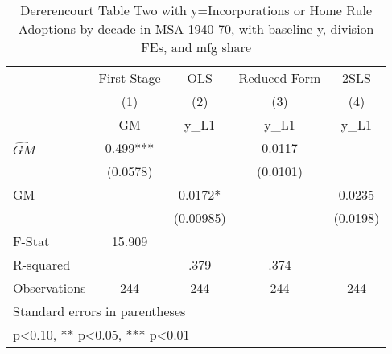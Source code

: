 \begin{table}[htbp]\centering
\def\sym#1{\ifmmode^{#1}\else\(^{#1}\)\fi}
\caption{Dererencourt Table Two with y=Incorporations or Home Rule Adoptions by decade in MSA 1940-70, with baseline y, division FEs, and mfg share}
\begin{tabular}{l*{4}{c}}
\toprule
                    & First Stage   &         OLS   &Reduced Form   &        2SLS   \\
                    &\multicolumn{1}{c}{(1)}&\multicolumn{1}{c}{(2)}&\multicolumn{1}{c}{(3)}&\multicolumn{1}{c}{(4)}\\
                    &\multicolumn{1}{c}{GM}&\multicolumn{1}{c}{y\_L1}&\multicolumn{1}{c}{y\_L1}&\multicolumn{1}{c}{y\_L1}\\
\midrule
$\hat{GM}$          &       0.499***&               &      0.0117   &               \\
                    &    (0.0578)   &               &    (0.0101)   &               \\
\addlinespace
GM                  &               &      0.0172*  &               &      0.0235   \\
                    &               &   (0.00985)   &               &    (0.0198)   \\
\midrule
F-Stat              &      15.909   &               &               &               \\
R-squared           &               &        .379   &        .374   &               \\
Observations        &         244   &         244   &         244   &         244   \\
\bottomrule
\multicolumn{5}{l}{\footnotesize Standard errors in parentheses}\\
\multicolumn{5}{l}{\footnotesize * p<0.10, ** p<0.05, *** p<0.01}\\
\end{tabular}
\end{table}
